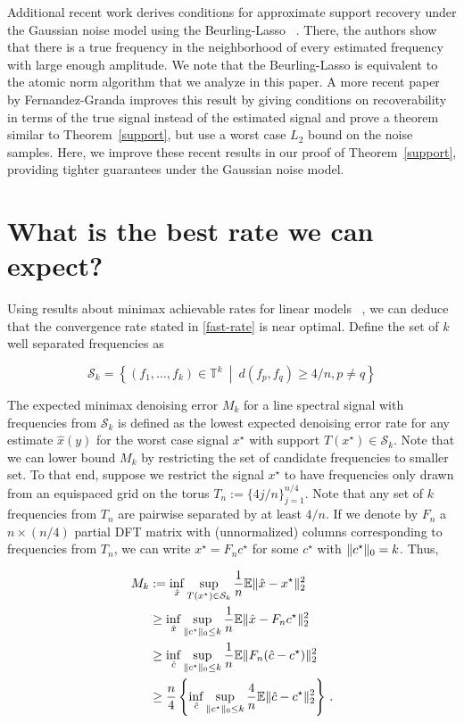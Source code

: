 Additional recent work derives conditions for approximate support recovery
under the Gaussian noise model using the Beurling-Lasso ~\cite{azais}. There,
the authors show that there is a true frequency in the neighborhood of every
estimated frequency with large enough amplitude. We note that the
Beurling-Lasso is equivalent to the atomic norm algorithm that we analyze in
this paper. A more recent paper by Fernandez-Granda{\cite{granda2}} improves
this result by giving conditions on recoverability in terms of the true signal
instead of the estimated signal and prove a theorem similar to
Theorem~\ref{support}, but use a worst case $L_2$ bound on the noise samples.
Here, we improve these recent results in our proof of Theorem~\ref{support},
providing tighter guarantees under the Gaussian noise model.
 
\section{What is the best rate we can expect?}\label{sec:minimax}

Using results about minimax achievable rates for linear models~
\cite{cd_minimax,rw_minimax}, we can deduce that the convergence rate stated in
\eqref{fast-rate} is near optimal. Define the set of $k$ well separated
frequencies as

\[
\mathcal{S}_k = \left\{(f_1, \dots, f_k) \in \mathbb{T}^k ~\middle|~  d(f_p, f_q) \geq 4/n, p \neq q \right\}
\]

The expected minimax denoising error $M_k$ for a line spectral signal with
frequencies from $\mathcal{S}_k$ is defined as the lowest expected denoising
error rate for any estimate $\hat{x}(y)$ for the worst case signal $x^\star$
with support $T(x^\star) \in \mathcal{S}_k$. Note that we can lower bound $M_k$
by restricting the set of candidate frequencies to smaller set. To that end,
suppose we restrict the signal $x^\star$ to have frequencies only drawn from an
equispaced grid on the torus $T_n := \{ 4 j/n \}_{j=1}^{n/4}$. Note that any set
of $k$ frequencies from $T_n$ are pairwise separated by at least $4/n$. If we
denote by $F_n$ a $n \times (n/4)$ partial DFT matrix with (unnormalized)
columns corresponding to frequencies from $T_n$, we can write $x^\star = F_n
c^\star$ for some $c^\star$ with $\lVert c^\star\rVert_0 = k$. Thus,

\begin{align*}
M_k &:= \inf_{\hat{x}}
 \sup_{
	T(x^\star) \in \mathcal{S}_k}
\frac{1}{n} \mathbb{E} \lVert\hat{x} - x^\star\rVert_2^2
	\\
&\geq \inf_{\hat{x}} 
 \sup_{
	\lVert c^\star\rVert_0 \leq k
	} \frac{1}{n} \mathbb{E} \lVert\hat{x} - F_n c^\star\rVert_2^2\\
&\geq \inf_{\hat{c}}
 \sup_{\lVert c^\star\rVert_0 \leq k} \frac{1}{n} \mathbb{E} \lVert F_n(\hat{c} - c^\star)\rVert_2^2\\
&\geq  \frac{n}{4} \left\{ \inf_{\hat{c}}
 \sup_{\lVert c^\star\rVert_0 \leq k}\frac{4}{n} \mathbb{E} \lVert\hat{c} - c^\star\rVert_2^2\right\}\,.
\end{align*}

